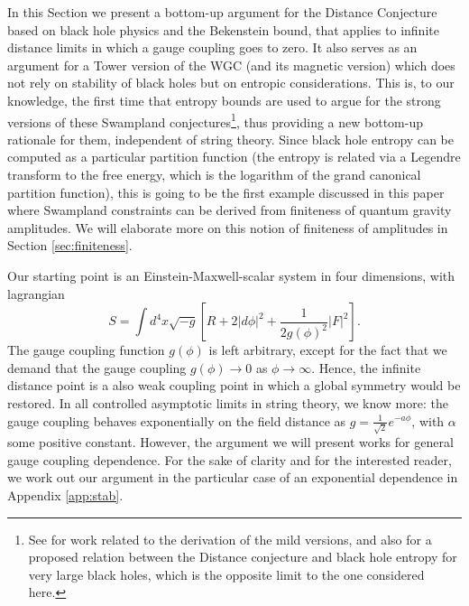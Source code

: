 \documentclass[11pt]{article}
\numberwithin{equation}{section}
\numberwithin{equation}{section}
\theoremstyle{remark}
\begin{document}
In this Section we present a bottom-up argument for the Distance Conjecture based on black hole physics and the Bekenstein bound, that applies to infinite distance limits in which a gauge coupling goes to zero. It also serves as an argument for a Tower version of the WGC \cite{Heidenreich:2015nta,Heidenreich:2016aqi,Andriolo:2018lvp} (and its magnetic version) which does not rely on stability of black holes but on entropic considerations. This is, to our knowledge, the first time that entropy bounds are used to argue for the strong versions of these Swampland conjectures\footnote{See \cite{Cheung:2018cwt,Hamada:2018dde,Montero:2018fns,Arkani-Hamed:2021ajd} for work related to the derivation of the mild versions, and also \cite{Bonnefoy:2019nzv} for a proposed relation between the Distance conjecture  and black hole entropy for very large black holes, which is the opposite limit to the one considered here.}, thus providing a new bottom-up rationale for them, independent of string theory. Since black hole entropy can be computed as a particular partition function (the entropy is related via a Legendre transform to the free energy, which is the logarithm of the grand canonical partition function), this is going to be the first example discussed in this paper where Swampland constraints can be derived from finiteness of quantum gravity amplitudes. We will elaborate more on this notion of finiteness of amplitudes in Section \ref{sec:finiteness}.

Our starting point is an Einstein-Maxwell-scalar system in four dimensions, with lagrangian 
\begin{equation}\label{action} S=\int d^4x \sqrt{-g}\left[R+2\vert d\phi\vert^2+\frac{1}{2g(\phi)^2} \vert F\vert^2\right].\end{equation}
The gauge coupling function $g(\phi)$ is left arbitrary, except for the fact that we demand that the gauge coupling $g(\phi)\rightarrow 0$ as $\phi\rightarrow \infty$. Hence, the infinite distance point is a also weak coupling point in which a global symmetry would be restored. In all controlled asymptotic limits in string theory, we know more: the gauge coupling behaves exponentially on the field distance as $g=\frac{1}{\sqrt{2}}e^{-a\phi}$,
with $\alpha$ some positive constant. However, the argument we will present works for general gauge coupling dependence. For the sake of clarity and for the interested reader, we work out our argument in the particular case of an exponential dependence in Appendix \ref{app:stab}.
\end{document}
